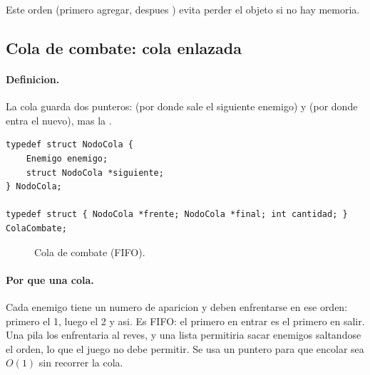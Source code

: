 \documentclass[11pt,a4paper]{article}
\newcommand{\fn}[1]{\texttt{\detokenize{#1}}}
\begin{document}
Este orden (primero agregar, despues \fn{pop}) evita perder el objeto si no hay memoria.

\subsection{Cola de combate: cola enlazada}

\paragraph{Definicion.}
La cola guarda dos punteros: \fn{frente} (por donde sale el siguiente enemigo) y
\fn{final} (por donde entra el nuevo), mas la \fn{cantidad}.

\begin{lstlisting}
typedef struct NodoCola {
    Enemigo enemigo;
    struct NodoCola *siguiente;
} NodoCola;

typedef struct { NodoCola *frente; NodoCola *final; int cantidad; } ColaCombate;
\end{lstlisting}

\begin{figure}[h]
\centering
{}
\caption{Cola de combate (FIFO).}
\end{figure}

\paragraph{Por que una cola.}
Cada enemigo tiene un numero de aparicion y deben enfrentarse en ese orden:
primero el 1, luego el 2 y asi. Es FIFO: el primero en entrar es el primero en
salir. Una pila los enfrentaria al reves, y una lista permitiria sacar enemigos
saltandose el orden, lo que el juego no debe permitir. Se usa un puntero \fn{final}
para que encolar sea $O(1)$ sin recorrer la cola.
\end{document}
